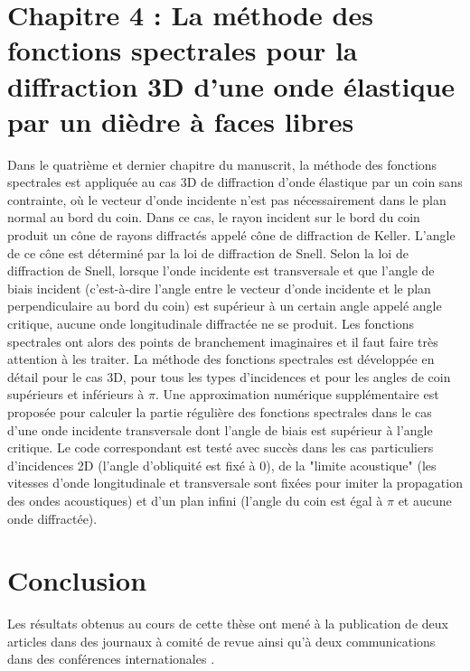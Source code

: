\section{Chapitre 4 : La méthode des fonctions spectrales pour la diffraction 3D d'une onde élastique par un dièdre à faces libres}

Dans le quatrième et dernier chapitre du manuscrit, la méthode des fonctions spectrales est appliquée au cas 3D de diffraction d'onde élastique par un coin sans contrainte, où le vecteur d'onde incidente n'est pas nécessairement dans le plan normal au bord du coin. Dans ce cas, le rayon incident sur le bord du coin produit un cône de rayons diffractés appelé cône de diffraction de Keller. L'angle de ce cône est déterminé par la loi de diffraction de Snell. Selon la loi de diffraction de Snell, lorsque l'onde incidente est transversale et que l'angle de biais incident (c'est-à-dire l'angle entre le vecteur d'onde incidente et le plan perpendiculaire au bord du coin) est supérieur à un certain angle appelé angle critique, aucune onde longitudinale diffractée ne se produit. Les fonctions spectrales ont alors des points de branchement imaginaires et il faut faire très attention à les traiter. La méthode des fonctions spectrales est développée en détail pour le cas 3D, pour tous les types d'incidences et pour les angles de coin supérieurs et inférieurs à $\pi$. Une approximation numérique supplémentaire est proposée pour calculer la partie régulière des fonctions spectrales dans le cas d'une onde incidente transversale dont l'angle de biais est supérieur à l'angle critique. Le code correspondant est testé avec succès dans les cas particuliers d'incidences 2D (l'angle d'obliquité est fixé à $0$), de la "limite acoustique" (les vitesses d'onde longitudinale et transversale sont fixées pour imiter la propagation des ondes acoustiques) et d'un plan infini (l'angle du coin est égal à $\pi$ et aucune onde diffractée).

\section*{Conclusion}

Les résultats obtenus au cours de cette thèse ont mené à la publication de deux articles dans des journaux à comité de revue \cite{article, articleelasto} ainsi qu'à deux communications dans des conférences internationales \cite{DD2018,AFPAC}.
